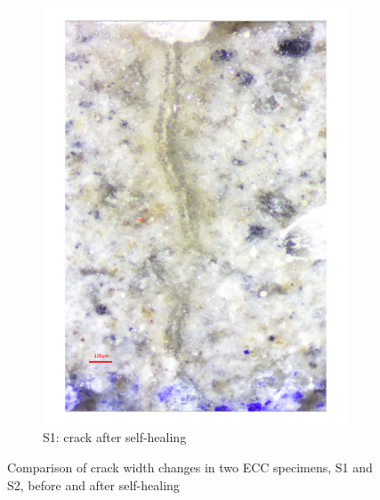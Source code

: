 \documentclass[11pt]{article}
\begin{document}
\begin{figure}[!h]
\begin{subfigure}{0.3\textwidth}
		\includegraphics[width = \linewidth]{crack1}
		\caption{S1: crack after self-healing}
	\end{subfigure}	
		\caption{Comparison of crack width changes in two ECC specimens, S1 and S2, before and after self-healing}\label{f:cr2}
	\end{figure}
	
	
%
%		
		
\end{document}
